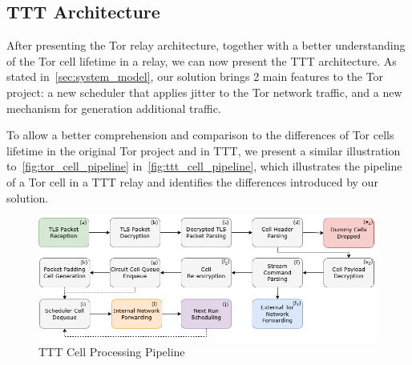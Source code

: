 \subsection{TTT Architecture}\label{sec:ttt_architecture}

After presenting the Tor relay architecture, together with a better understanding of the Tor cell lifetime in a relay, we can now present the TTT architecture. As stated in~\autoref{sec:system_model}, our solution brings 2 main features to the Tor project: a new scheduler that applies jitter to the Tor network traffic, and a new mechanism for generation additional traffic.

To allow a better comprehension and comparison to the differences of Tor cells lifetime in the original Tor project and in TTT, we present a similar illustration to~\autoref{fig:tor_cell_pipeline} in~\autoref{fig:ttt_cell_pipeline}, which illustrates the pipeline of a Tor cell in a TTT relay and identifies the differences introduced by our solution.
\begin{figure}[!h]
  \centering
  \includegraphics[width=\textwidth]{Chapters/Figures/Solution_Cell_Pipeline.png}
  \caption{TTT Cell Processing Pipeline}\label{fig:ttt_cell_pipeline}
\end{figure}

